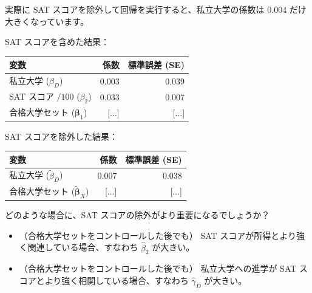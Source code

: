 \documentclass[11pt,handout]{beamer}
\newenvironment{wideitemize}{\itemize\addtolength{\itemsep}{10pt}}{\enditemize}
\begin{document}
\begin{frame}
	\begin{wideitemize}
		\item
		実際に SAT スコアを除外して回帰を実行すると、私立大学の係数は $0.004$ だけ大きくなっています。
		
		\item
		SAT スコアを含めた結果：
		
			\begin{tabular}{lrr}
			変数 & 係数 & 標準誤差 (SE) \\ \hline
			私立大学 ($\beta_D$) & 0.003 & 0.039 \\
			SAT スコア $/ 100$ ($\beta_2$) & 0.033 & 0.007 \\
			合格大学セット ($\bm\beta_1$) & [...] & [...]
		\end{tabular}
		
		
		\item
		SAT スコアを除外した結果：
					\begin{tabular}{lrr}
			変数 & 係数 & 標準誤差 (SE) \\ \hline
			私立大学 ($\tilde\beta_D$) & 0.007 & 0.038 \\
			合格大学セット ($\bm{\tilde\beta}_X$) & [...] & [...]
		\end{tabular}
	
		\item
		どのような場合に、SAT スコアの除外がより重要になるでしょうか？ \pause
			\begin{itemize}
				\item 
				（合格大学セットをコントロールした後でも） SAT スコアが所得とより強く関連している場合、すなわち $\hat\beta_2$ が大きい。
				
				\pause
				\item
				（合格大学セットをコントロールした後でも） 私立大学への進学が SAT スコアとより強く相関している場合、すなわち $\hat\gamma_D$ が大きい。
			\end{itemize}
			
	\end{wideitemize}
\end{frame}
\end{document}
